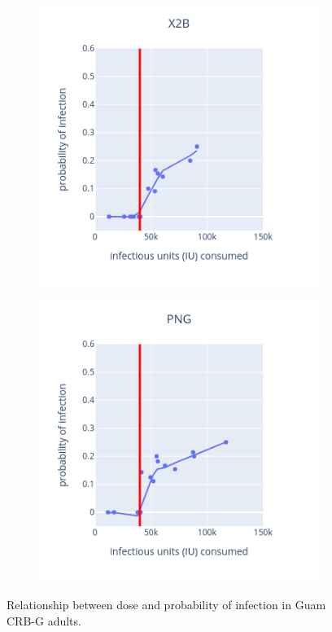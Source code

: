 \documentclass[12pt,letterpaper,english,bibliography=totocnumbered, abstract=on]{scrartcl}
\begin{document}
\begin{figure}[H]
\begin{subfigure}{.49\textwidth}
	\end{subfigure}
	\begin{subfigure}{.49\textwidth}
		\includegraphics[width=\textwidth]{images/X2B_infection_probability.png}
	\end{subfigure}
	\begin{subfigure}{.49\textwidth}
		\includegraphics[width=\textwidth]{images/PNG_infection_probability.png}
	\end{subfigure}
	\caption{Relationship between dose and probability of infection in Guam CRB-G adults.}
	\label{fig:infection probability}
\end{figure}
\end{document}
